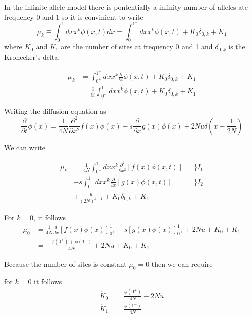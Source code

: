 \documentclass[a4paper, 12pt]{article}
\newcommand{\del}[1]{\ensuremath{\frac{\partial}{\partial #1}}}
\newcommand{\dell}[1]{\ensuremath{\frac{\partial^2}{\partial {#1}^2}}}
\newcommand{\dev}[1]{\ensuremath{\frac{d}{d #1}}}
\begin{document}
In the infinite allele model there is pontentially a infinity number of alleles
ate frequency 0 and 1 so it is convinient to write 
\[
\mu_k \equiv \int_{0}^{1}dx x^k \phi(x,t)dx 
= \int_{0^+}^{1^-}dx x^k \phi(x,t) + K_0 \delta_{0,k} + K_1
\]
where $K_0$ and $K_1$ are the number of sites at frequency 0 and 1 and 
$\delta_{0,k}$ is the Kronecker's delta. 

\begin{align}
  \dot \mu_k 
  &= \int_{0^+}^{1^-}dx x^k \del t \phi(x,t) 
  + \dot K_0 \delta_{0,k} + \dot K_1 
  \nonumber \\
  &= \del t \int_{0^+}^{1^-}dx x^k \phi(x,t) 
  + \dot K_0 \delta_{0,k} + \dot K_1 
\end{align}

Writing the diffusion equation as 
\[
  \del t \phi (x) =  
  \frac{1}{4N} \dell x f(x)\phi(x) - s \del x g(x)\phi(x) 
  + 2Nu\delta(x  - \frac{1}{2N})
\]

We can write 

\begin{align}
  \dot \mu_k 
  &= \frac{1}{4N}\int_{0^+}^{1^-}dx x^k \dell x [f(x)\phi(x,t)] & & \bigg\} I_1
  \nonumber \\
  \quad &- s\int_{0^+}^{1^-}dx x^k \del x [g(x)\phi(x,t)] & & \bigg\} I_2
  \nonumber \\
  \quad &+\frac{u}{(2N)^{k -1}} + \dot K_0 \delta_{0,k} + \dot K_1 
  \label{eq:dmk}
\end{align}

For $k = 0$, it follows 
\begin{align}
  \dot \mu_0 &= \frac{1}{4N} \dev x [f(x)\phi(x)]_{0^+}^{1^-}
  - s [g(x)\phi(x)]_{0^+}^{1^-}
  +2Nu + \dot K_0  + \dot K_1 
  \nonumber \\
 &= - \frac{\phi(0^+) + \phi(1^-)}{4N}
  +2Nu + \dot K_0  + \dot K_1
\end{align}

Because the number of sites is constant $\dot \mu_0 = 0$ then we can require

for $k = 0$ it follows 
\begin{align}
  \dot K_0 &= \frac{\phi(0^+)}{4N} - 2Nu \\
  \dot K_1 &= \frac{\phi(1^-)}{4N}
\end{align}
\end{document}

